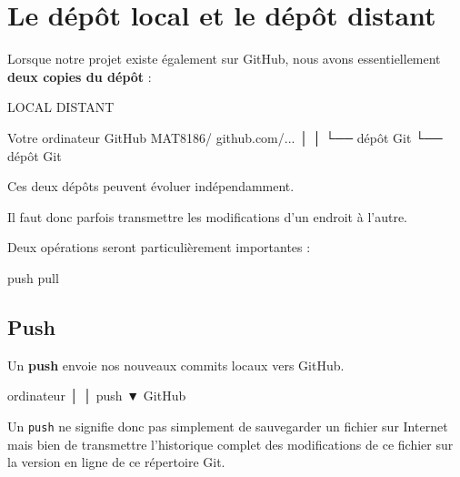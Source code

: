 \documentclass[
  letterpaper,
  DIV=11,
  numbers=noendperiod]{scrreprt}
\newenvironment{Shaded}{\begin{snugshade}}{\end{snugshade}}
\newcommand{\NormalTok}[1]{\textcolor[rgb]{0.00,0.23,0.31}{#1}}
\begin{document}

\chapter{Le dépôt local et le dépôt
distant}\label{le-duxe9puxf4t-local-et-le-duxe9puxf4t-distant}

Lorsque notre projet existe également sur GitHub, nous avons
essentiellement \textbf{deux copies du dépôt} :

\begin{Shaded}
\begin{Highlighting}[]
\NormalTok{LOCAL                         DISTANT}

\NormalTok{Votre ordinateur              GitHub}
\NormalTok{MAT8186/                       github.com/...}
\NormalTok{    │                              │}
\NormalTok{    └── dépôt Git                  └── dépôt Git}
\end{Highlighting}
\end{Shaded}

Ces deux dépôts peuvent évoluer indépendamment.

Il faut donc parfois transmettre les modifications d'un endroit à
l'autre.

Deux opérations seront particulièrement importantes :

\begin{Shaded}
\begin{Highlighting}[]
\NormalTok{push}
\NormalTok{pull}
\end{Highlighting}
\end{Shaded}

\section{Push}\label{push}

Un \textbf{push} envoie nos nouveaux commits locaux vers GitHub.

\begin{Shaded}
\begin{Highlighting}[]
\NormalTok{ordinateur}
\NormalTok{    │}
\NormalTok{    │ push}
\NormalTok{    ▼}
\NormalTok{ GitHub}
\end{Highlighting}
\end{Shaded}

Un \texttt{push} ne signifie donc pas simplement de sauvegarder un
fichier sur Internet mais bien de transmettre l'historique complet des
modifications de ce fichier sur la version en ligne de ce répertoire
Git.
\end{document}
